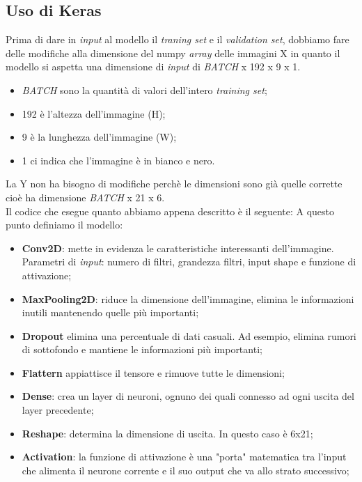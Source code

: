 \subsection{Uso di Keras}
Prima di dare in \textit{input} al modello il \textit{traning set} e il \textit{validation set}, dobbiamo fare delle modifiche alla dimensione del numpy \textit{array} delle immagini X in quanto il modello si aspetta una dimensione di \textit{input} di \textit{BATCH} x 192 x 9 x 1.
\begin{itemize}
	\item \textit{BATCH} sono la quantità di valori dell'intero \textit{training set};
	\item 192 è l'altezza dell'immagine (H);
	\item 9 è la lunghezza dell'immagine (W);
	\item 1 ci indica che l'immagine è in bianco e nero.
\end{itemize}
La Y non ha bisogno di modifiche perchè le dimensioni sono già quelle corrette cioè ha dimensione \textit{BATCH} x 21 x 6.\\
\newline
Il codice che esegue quanto abbiamo appena descritto è il seguente:
\vspace*{2ex}
\vspace*{2ex}
A questo punto definiamo il modello:
\begin{itemize}
	\item \textbf{Conv2D}: mette in evidenza le caratteristiche interessanti dell'immagine. Parametri di \textit{input}: numero di filtri, grandezza filtri, input shape e funzione di attivazione;
	\item \textbf{MaxPooling2D}: riduce la dimensione dell'immagine, elimina le informazioni inutili mantenendo quelle più importanti;
	\item \textbf{Dropout} elimina una percentuale di dati casuali. Ad esempio, elimina rumori di sottofondo e mantiene le informazioni più importanti;
	\item \textbf{Flattern} appiattisce il tensore e rimuove tutte le dimensioni;
	\item \textbf{Dense}: crea un layer di neuroni, ognuno dei quali connesso ad ogni uscita del layer precedente;
	\item \textbf{Reshape}: determina la dimensione di uscita. In questo caso è 6x21;
	\item \textbf{Activation}: la funzione di attivazione è una "porta" matematica tra l'input che alimenta il neurone corrente e il suo output che va allo strato successivo;
\end{itemize}
